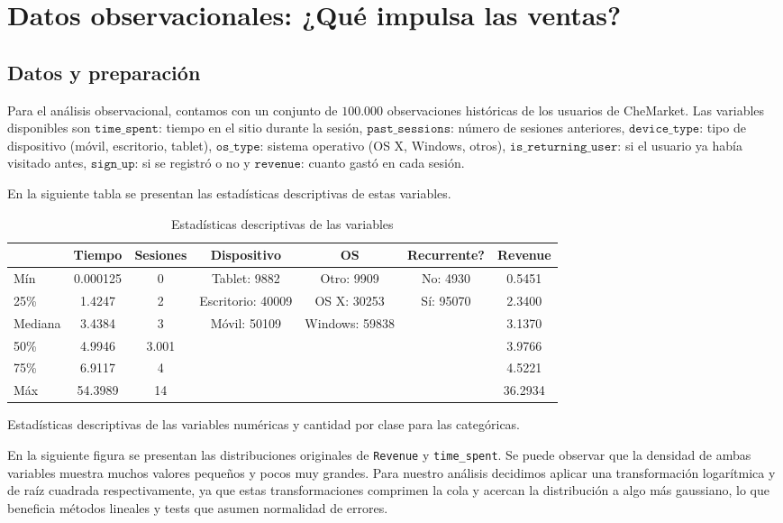 \documentclass[conference]{IEEEtran}
\begin{document}
\section{Datos observacionales: ¿Qué impulsa las ventas?}

\subsection{Datos y preparación}

Para el análisis observacional, contamos con un conjunto de $100.000$ observaciones históricas de los usuarios de CheMarket. Las variables disponibles son $\texttt{time\_spent}$: tiempo en el sitio durante la sesión, $\texttt{past\_sessions}$: número de sesiones anteriores, 
$\texttt{device\_type}$: tipo de dispositivo (móvil, escritorio, tablet), $\texttt{os\_type}$: sistema operativo (OS X, Windows, otros), $\texttt{is\_returning\_user}$: si el usuario ya había visitado antes, $\texttt{sign\_up}$: si se registró o no y $\texttt{revenue}$: cuanto gastó en cada sesión.

En la siguiente tabla se presentan las estadísticas descriptivas de estas variables.


\begin{table}[H]
\ssmall
\centering
\caption{Estadísticas descriptivas de las variables}
\begin{tabular}{|l|c|c|c|c|c|c|}
\hline
 & \textbf{Tiempo} & \textbf{Sesiones} & \textbf{Dispositivo} & \textbf{OS} & \textbf{Recurrente?} & \textbf{Revenue} \\
\hline
Mín & 0.000125 & 0 & Tablet: 9882 & Otro: 9909 & No: 4930 & 0.5451 \\
25\% & 1.4247 & 2 & Escritorio: 40009 & OS X: 30253 & Sí: 95070 & 2.3400 \\
Mediana & 3.4384 & 3 & Móvil: 50109 & Windows: 59838 & & 3.1370 \\
50\% & 4.9946 & 3.001 & & & & 3.9766 \\
75\%  & 6.9117 & 4  & & & & 4.5221 \\
Máx & 54.3989 & 14  & & & & 36.2934 \\
\hline
\end{tabular}

\hfill \break
Estadísticas descriptivas de las variables numéricas y cantidad por clase para las categóricas.

\end{table}

En la siguiente figura se presentan las distribuciones originales de \texttt{Revenue} y \texttt{time\_spent}.
Se puede observar que la densidad de ambas variables muestra muchos valores pequeños y pocos muy grandes.
Para nuestro análisis decidimos aplicar una transformación logarítmica y de raíz cuadrada respectivamente,
ya que estas transformaciones comprimen la cola y acercan la distribución a algo más gaussiano, 
lo que beneficia métodos lineales y tests que asumen normalidad de errores.
\end{document}
